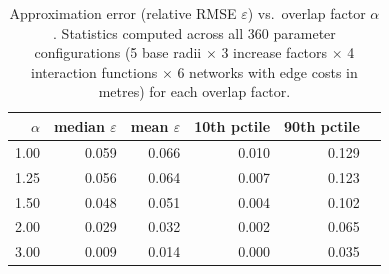 \begin{table}[t]
\centering
\caption{Approximation error (relative RMSE $\varepsilon$) vs.\ overlap
  factor $\alpha$. Statistics computed across all 360 parameter
  configurations (5 base radii $\times$ 3 increase factors $\times$
  4 interaction functions $\times$ 6 networks with edge costs in
  metres) for each overlap factor.}
\label{tab:overlap}
\begin{tabular}{rrrrrr}
\toprule
$\alpha$ & median $\varepsilon$ & mean $\varepsilon$
         & 10th pctile & 90th pctile \\
\midrule
1.00 & 0.059 & 0.066 & 0.010 & 0.129 \\
1.25 & 0.056 & 0.064 & 0.007 & 0.123 \\
1.50 & 0.048 & 0.051 & 0.004 & 0.102 \\
2.00 & 0.029 & 0.032 & 0.002 & 0.065 \\
3.00 & 0.009 & 0.014 & 0.000 & 0.035 \\
\bottomrule
\end{tabular}
\end{table}
